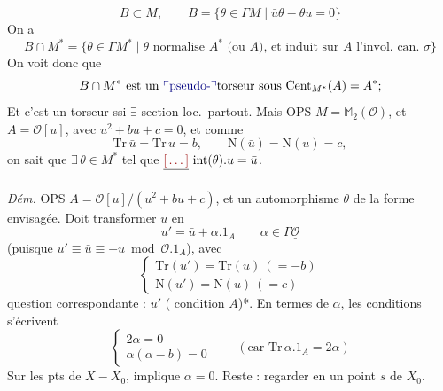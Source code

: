 \documentclass[11pt,a4paper]{article}
\begin{document}
\[
  B \subset M, \qquad B = \{\theta \in \Gamma M \mid \bar{u}\theta - \theta u = 0\}
\]
On a
\[
  B \cap M^{*} = \{\theta \in \Gamma M^{*} \mid \theta \text{ normalise } A^{*} \text{ (ou $A$), et induit sur $A$ l'invol.\ can.\ } \sigma\}
\]
On voit donc que
\[
  B \cap M^{*} \text{ est un \add{pseudo-}torseur sous } \mathrm{Cent}_{M^{*}}(A) = A^{*} ;
\]
Et c'est un torseur ssi $\exists$ section loc.\ partout. Mais \struck{\ill{}} OPS $M = \mathbb{M}_2(\mathcal{O})$, et \struck{\ill{}} $A = \mathcal{O}[u]$, avec $u^{2} + bu + c = 0$, et comme
\[
  \mathrm{Tr}\,\bar{u} = \mathrm{Tr}\, u = b, \qquad \mathrm{N}(\bar{u}) = \mathrm{N}(u) = c,
\]
on sait que $\exists\, \theta \in M^{*}$ tel que $\struck{\ill{}}\ \mathrm{int}(\theta).u = \bar{u}$.

\emph{Dém.} OPS $A = \mathcal{O}[u]/(u^{2} + bu + c)$, et un automorphisme $\theta$ de la forme envisagée. Doit transformer $u$ en
\[
  u' = \bar{u} + \alpha.1_A \qquad \alpha \in \Gamma\underline{\mathcal{O}}
\]
(puisque $u' \equiv \bar{u} \equiv -u \bmod \underline{\mathcal{O}}.1_A$), avec
\[
  \left\{\begin{array}{l}
    \mathrm{Tr}(u') = \mathrm{Tr}(u) \ (= -b) \\
    \mathrm{N}(u') = \mathrm{N}(u) \ (= c)
  \end{array}\right.
\]
\struck{\ill{}}  question correspondante   :  $u'$ ( condition  $A$)*. \struck{\ill{}} En termes de $\alpha$, les conditions s'écrivent
\[
  \left\{\begin{array}{l}
    2\alpha = 0 \\
    \alpha(\alpha - b) = 0
  \end{array}\right.
  \qquad (\text{car } \mathrm{Tr}\, \alpha.1_A = 2\alpha)
\]
\struck{\ill{}} Sur les pts de $X - X_0$, \struck{\ill{}}  implique $\alpha = 0$. Reste : regarder en un point $s$ de $X_0$. 
\end{document}
